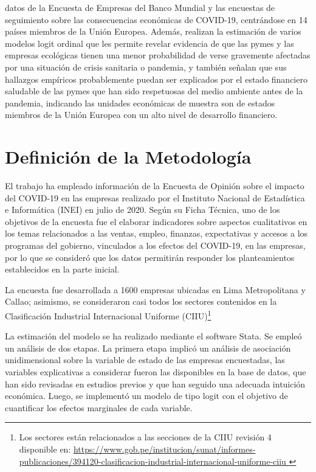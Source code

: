 \documentclass[12pt]{article}
\begin{document}
        datos de la Encuesta de Empresas del Banco Mundial y las encuestas de seguimiento sobre las consecuencias
        económicas de COVID-19, centrándose en 14 países miembros de la Unión Europea. Además, realizan la estimación
        de varios modelos logit ordinal que les permite revelar evidencia de que las pymes y las empresas ecológicas
        tienen una menor probabilidad de verse gravemente afectadas por una situación de crisis sanitaria o pandemia, y
        también señalan que sus hallazgos empíricos probablemente puedan ser explicados por el estado financiero saludable
        de las pymes que han sido respetuosas del medio ambiente antes de la pandemia, indicando las unidades económicas
        de muestra son de estados miembros de la Unión Europea con un alto nivel de desarrollo financiero.
        \section{Definición de la Metodología}
        El trabajo ha empleado información de la Encuesta de Opinión sobre el impacto del COVID-19 en las empresas
        realizado por el Instituto Nacional de Estadística e Informática (INEI) en julio de 2020. Según su Ficha Técnica,
        uno de los objetivos de la encuesta fue el elaborar indicadores sobre aspectos cualitativos en los temas relacionados
        a las ventas, empleo, finanzas, expectativas y accesos a los programas del gobierno, vinculados a los efectos del COVID-19,
        en las empresas, por lo que se consideró que los datos permitirán responder los planteamientos establecidos en la parte inicial.
    
        La encuesta fue desarrollada a 1600 empresas ubicadas en Lima Metropolitana y Callao; asimismo, se consideraron casi 
        todos los sectores contenidos en la Clasificación Industrial Internacional Uniforme
        (CIIU)\footnote{Los sectores están relacionados a las secciones de la CIIU revisión 4 disponible
        en: \textcolor{blue}{\url{https://www.gob.pe/institucion/sunat/informes-publicaciones/394120-clasificacion-industrial-internacional-uniforme-ciiu }}}

        La estimación del modelo se ha realizado mediante el software Stata. Se empleó un análisis de dos etapas.
        La primera etapa implicó un análisis de asociación unidimensional sobre la variable de estado de las empresas encuestadas,
        las variables explicativas a considerar fueron las disponibles en la base de datos, que han sido revisadas en estudios previos
        y que han seguido una adecuada intuición económica. Luego, se implementó un modelo de tipo logit con el objetivo de
        cuantificar los efectos marginales de cada variable.
\end{document}
